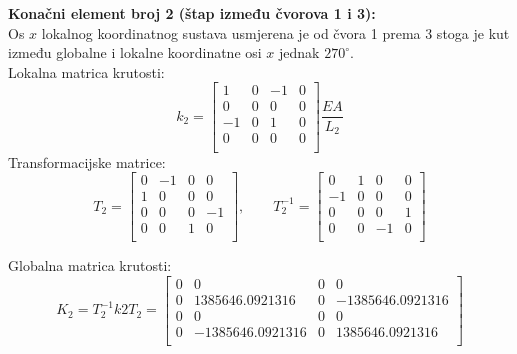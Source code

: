 \documentclass[a4paper,twoside,12pt]{memoir} %
\begin{document}
\textbf{Konačni element broj 2 (štap između čvorova 1 i 3):} \\
Os $x$ lokalnog koordinatnog sustava usmjerena je od čvora 1 prema 3 stoga je kut između globalne i lokalne koordinatne osi $x$ jednak $270^\circ$. \\
Lokalna matrica krutosti:
\begin{equation}
    k_2 = 
    \begin{bmatrix}
    1 & 0 & -1 & 0 \\
    0 & 0 & 0 & 0 \\
    -1 & 0 & 1 & 0 \\
    0 & 0 & 0 & 0 \\
    \end{bmatrix}  \frac{E  A}{L_2}
\end{equation}
Transformacijske matrice:
\begin{equation}
    T_2 =
    \begin{bmatrix}
    0 & -1 & 0 & 0 \\
    1 & 0 & 0 & 0 \\
    0 & 0 & 0 & -1 \\
    0 & 0 & 1 & 0 \\
    \end{bmatrix}, \qquad
    T^{-1}_2 =
    \begin{bmatrix}
    0 & 1 & 0 & 0 \\
    -1 & 0 & 0 & 0 \\
    0 & 0 & 0 & 1 \\
    0 & 0 & -1 & 0 \\
    \end{bmatrix}
\end{equation}

Globalna matrica krutosti:
\begin{equation}
    K_2 = T^{-1}_2  k2  T_2 =
    \begin{bmatrix}
    0 & 0 & 0 & 0 \\
    0 & 1385646.0921316 & 0 & -1385646.0921316 \\
    0 & 0 & 0 & 0 \\
    0 & -1385646.0921316 & 0 & 1385646.0921316 \\
    \end{bmatrix}
\end{equation}
\end{document}
